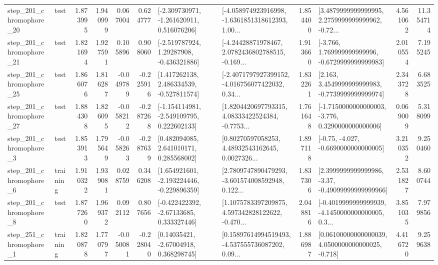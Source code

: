 \begin{tabular}{llrrrrllrlrr}
  step\_201\_chromophore\_20 &      test &      1.873995 &    1.940999 &      0.067004 &  0.624777 &   [-2.309730971, -1.261620911, 0.516076206] &  [-4.058974923916998, -1.6361851318612393, 1.00... &       1.854400 &  [3.4879999999999995, 2.2759999999999962, -0.72... &            4.561062 &         11.354714 \\
  step\_201\_chromophore\_21 &      test &      1.821694 &    1.927591 &      0.105896 &  0.908060 &    [-2.519787924, 1.29287908, -0.436321886] &  [-4.24428871978467, 2.0782436802788515, -0.169... &       1.913660 &   [-3.766, 1.769999999999996, -0.6729999999999983] &            2.010554 &          7.195245 \\
  step\_201\_chromophore\_25 &      test &      1.866076 &    1.816287 &     -0.049789 & -0.225916 &    [1.417262138, 2.486334539, -0.527811574] &  [-2.4071797927399152, -4.016756077422032, 0.34... &       1.832261 &   [2.163, 3.4549999999999983, -0.7739999999999974] &            2.343728 &          6.683525 \\
  step\_201\_chromophore\_27 &      test &      1.884308 &    1.826095 &     -0.058212 & -0.287268 &   [-1.154114981, -2.549109795, 0.222602133] &  [1.8204420697793315, 4.08333422524384, -0.7753... &       1.761648 &  [-1.7150000000000003, -3.776, 0.3290000000000006] &            0.069009 &          5.318099 \\
   step\_201\_chromophore\_3 &      test &      1.853913 &    1.795649 &     -0.058263 & -0.287639 &     [0.482094085, 2.641010171, 0.285568002] &  [0.80270597058253, 4.48932543162645, 0.0027326... &       1.897118 &               [-0.75, -4.027, -0.6690000000000005] &            3.210352 &          9.250460 \\
   step\_201\_chromophore\_6 &  training &      1.910322 &    1.939081 &      0.028759 &  0.346208 &   [1.654921601, -2.193224446, -0.229896359] &  [2.7809747890479293, -3.601574008592948, 0.122... &       1.837306 &  [2.3999999999999986, -3.37, -0.49099999999999966] &            2.531827 &          8.600744 \\
   step\_201\_chromophore\_8 &      test &      1.877260 &    1.969372 &      0.092112 &  0.807656 &    [-0.422422392, -2.67133685, 0.333327446] &  [1.1075783397209875, 4.597342828122622, -0.470... &       2.048816 &  [-0.4019999999999939, -4.1450000000000005, 0.3... &            3.851035 &          7.979856 \\
   step\_251\_chromophore\_1 &  training &      1.820878 &    1.770797 &     -0.050081 & -0.228040 &      [0.14035421, -2.67004918, 0.368298745] &  [0.15897614994519493, -4.537555736087202, 0.09... &       1.886987 &  [0.06100000000000039, 4.0500000000000025, -0.718] &            4.416720 &          9.259638 \\

\end{tabular}

